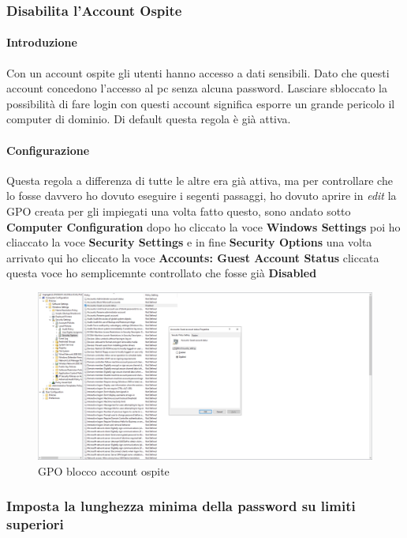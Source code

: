 \documentclass[../main.tex]{subfiles}
\begin{document}
\pagebreak{}
\thispagestyle{header-pages}

\subsubsection{Disabilita l'Account Ospite}
\paragraph{Introduzione}
Con un account ospite gli utenti hanno accesso a dati sensibili. Dato che questi account concedono l'accesso al pc senza alcuna password. Lasciare sbloccato la possibilità di fare login con questi account significa esporre un grande pericolo il computer di dominio. Di default questa regola è già attiva.

\paragraph{Configurazione}
Questa regola a differenza di tutte le altre era già attiva, ma per controllare che lo fosse davvero ho dovuto eseguire i segenti passaggi, ho dovuto aprire in \textit{edit} la GPO creata per gli impiegati una volta fatto questo, sono andato sotto \textbf{Computer Configuration} dopo ho cliccato la voce \textbf{Windows Settings} poi ho cliaccato la voce \textbf{Security Settings} e in fine \textbf{Security Options} una volta arrivato qui ho cliccato la voce \textbf{Accounts: Guest Account Status} cliccata questa voce ho semplicemnte controllato che fosse già \textbf{Disabled}

\begin{figure}[h]
    \centering
    \includegraphics[width=1\textwidth]{Images/ospite.png}
    \caption{GPO blocco account ospite}
\end{figure}

\pagebreak{}
\thispagestyle{header-pages}
\subsubsection{Imposta la lunghezza minima della password su limiti superiori}
\end{document}
